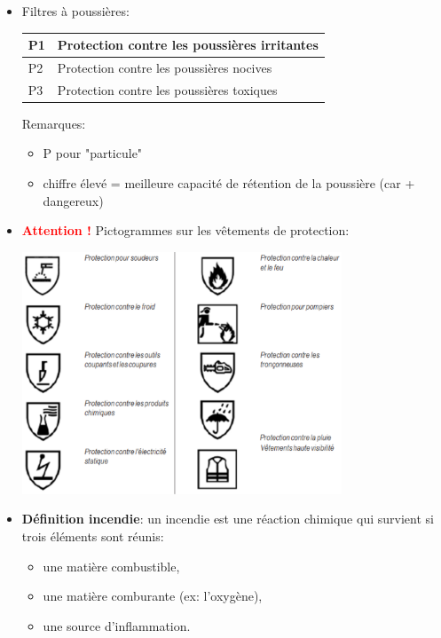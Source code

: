\documentclass[a4paper]{article}
\begin{document}
\begin{itemize}
\item Filtres à poussières:
\begin{center}
    \begin{tabular}{|l|l|} \hline
        P1 & Protection contre les poussières irritantes \\ \hline
        P2 & Protection contre les poussières nocives \\ \hline
        P3 & Protection contre les poussières toxiques \\ \hline
    \end{tabular}
\end{center}
Remarques:
\begin{itemize}
    \item P pour "particule"
    \item chiffre élevé = meilleure capacité de rétention de la poussière (car + dangereux)
\end{itemize}





\item \textcolor{red}{\textbf{Attention !}} Pictogrammes sur les vêtements de protection:
\begin{center}
\includegraphics[width=0.75\textwidth]{images/vetements-protection.PNG}
\end{center}





\item \textbf{Définition incendie}: un incendie est une réaction chimique qui survient si trois éléments sont réunis:
\begin{itemize}
    \item une matière combustible,
    \item une matière comburante (ex: l’oxygène),
    \item une source d’inflammation.
\end{itemize}






\end{itemize}
\end{document}

